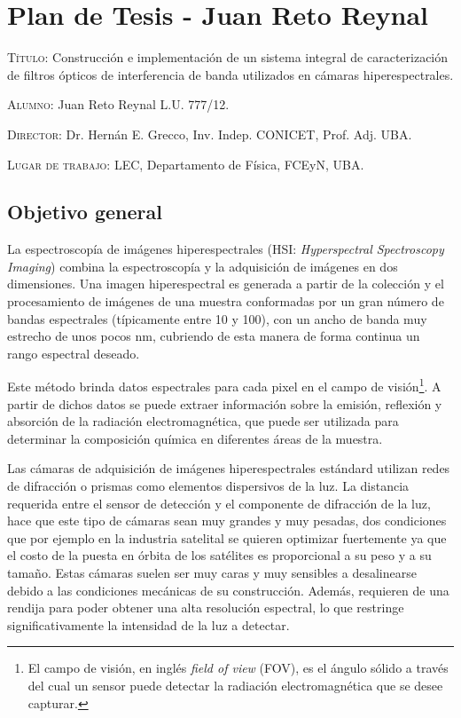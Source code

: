 \documentclass{ctuthesis}
\begin{document}
\maketitle
\renewcommand{\chaptername}{Capítulo}
\renewcommand{\figurename}{Figura}
\chapter*{Plan de Tesis - Juan Reto Reynal}


\textsc{Título:} Construcción e implementación de un sistema integral de 
caracterización de filtros ópticos de interferencia de banda utilizados en 
cámaras 
hiperespectrales.


\hspace{-0.4cm}\textsc{Alumno:} Juan Reto Reynal L.U. 777/12.

\hspace{-0.4cm}\textsc{Director:} Dr. Hernán E. Grecco, Inv. Indep. CONICET, 
Prof. Adj. UBA.

\hspace{-0.4cm}\textsc{Lugar de trabajo:} LEC, Departamento de Física, FCEyN, UBA.


\section*{Objetivo general}

\hspace{0.5cm}La espectroscopía de imágenes hiperespectrales (HSI: 
\textit{Hyperspectral Spectroscopy Imaging}) combina la 
espectroscopía 
y la 
adquisición de 
	imágenes en dos dimensiones. Una imagen hiperespectral es generada a partir 
	de la colección y el procesamiento de imágenes de una muestra conformadas 
	por un gran número de bandas espectrales (típicamente entre 10 y 100), con 
	un ancho de banda muy estrecho de unos pocos nm, cubriendo de esta manera 
	de forma continua un rango espectral deseado. 

Este método brinda datos espectrales para cada pixel en el campo de 
visión\footnote{El campo de visión, en inglés \textit{field of view} (FOV), es 
el ángulo sólido a través del cual un sensor puede detectar la radiación 
electromagnética que se desee capturar.}. A partir de dichos 
datos se puede extraer información sobre la emisión, reflexión y absorción de 
la radiación electromagnética, que puede ser utilizada para determinar la 
composición química en diferentes áreas de la muestra.

Las cámaras de adquisición de imágenes hiperespectrales estándard utilizan 
redes de difracción o prismas como elementos dispersivos de la luz. La 
distancia requerida entre el sensor de detección y  el componente de difracción 
de la luz, 
hace que este tipo de cámaras sean muy grandes y muy pesadas, dos condiciones 
que por ejemplo en la industria satelital se quieren optimizar fuertemente ya 
que el costo de la puesta en órbita de los satélites es proporcional a su peso 
y a su tamaño. 
Estas cámaras suelen ser muy caras y muy sensibles a desalinearse 
debido a las 
condiciones mecánicas de su construcción. Además, requieren de una rendija 
para poder obtener una alta resolución espectral, lo que restringe 
significativamente la intensidad de la luz a detectar.
\end{document}
